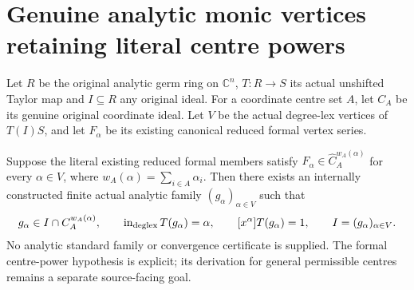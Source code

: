 \section{Genuine analytic monic vertices retaining literal centre powers}

Let $R$ be the original analytic germ ring on $\mathbb C^n$, $T:R\to S$
its actual unshifted Taylor map and $I\subseteq R$ any original ideal.
For a coordinate centre set $A$, let $C_A$ be its genuine original coordinate
ideal. Let $V$ be the actual degree-lex vertices of $T(I)S$, and let
$F_\alpha$ be its existing canonical reduced formal vertex series.

\begin{theorem}
\label{hir:actual-analytic-centre-compatible-monic-vertex-family}
\leanok
Suppose the literal existing reduced formal members satisfy
$F_\alpha\in\widehat C_A^{w_A(\alpha)}$ for every $\alpha\in V$,
where $w_A(\alpha)=\sum_{i\in A}\alpha_i$.
Then there exists an internally constructed finite actual analytic family
$(g_\alpha)_{\alpha\in V}$ such that
\[
 g_\alpha\in I\cap C_A^{w_A(\alpha)},\qquad
 \operatorname{in}_{\operatorname{deglex}} T(g_\alpha)=\alpha,\qquad
 [x^\alpha]T(g_\alpha)=1,\qquad I=(g_\alpha)_{\alpha\in V}.
\]
No analytic standard family or convergence certificate is supplied. The
formal centre-power hypothesis is explicit; its derivation for general
permissible centres remains a separate source-facing goal.
\end{theorem}
